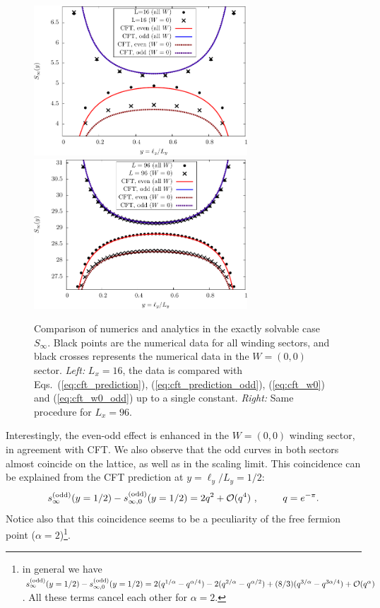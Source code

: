 \documentclass[11pt]{iopart}
\begin{document}
\begin{figure}[ht]
 \begin{center}
  \includegraphics[width=8cm]{./figures/sinfty_16.pdf}
  \includegraphics[width=8cm]{./figures/sinfty_96.pdf}
 \end{center}
\caption{Comparison of numerics and analytics in the exactly solvable case $S_\infty$. Black points are the numerical data for all winding sectors, and black crosses represents the numerical data in the $W=(0,0)$ sector. \emph{Left:} $L_x=16$, the data is compared with Eqs.~(\ref{eq:cft_prediction}), (\ref{eq:cft_prediction_odd}),  (\ref{eq:cft_w0}) and (\ref{eq:cft_w0_odd}) up to a single constant. \emph{Right:} Same procedure for $L_x=96$. }
\label{fig:Sinfty}
\end{figure}
Interestingly, the even-odd effect is enhanced in the $W=(0,0)$ winding sector, in agreement with CFT. We also observe that the odd curves in both sectors almost coincide on the lattice, as well as in the scaling limit. This coincidence can be explained from the CFT prediction at $y=\ell_y/L_y=1/2$:
\begin{equation}
 s_{\infty}^{\rm (odd)}(y=1/2)-s_{\infty,0}^{\rm (odd)}(y=1/2)=2q^2+\mathcal{O}(q^4) \ ,\qquad q=e^{-\pi}.
\end{equation}
Notice also that this coincidence seems to be a peculiarity of the free fermion point ($\alpha=2$)\footnote{in general we have $s_{\infty}^{\rm (odd)}(y=1/2)-s_{\infty,0}^{\rm (odd)}(y=1/2)=2(q^{1/\alpha}-q^{\alpha/4})-2(q^{2/\alpha}-q^{\alpha/2})+(8/3)(q^{3/\alpha}-q^{3\alpha/4})+\mathcal{O}(q^{\alpha})$. All these terms cancel each other for $\alpha=2$.}. 
\end{document}
